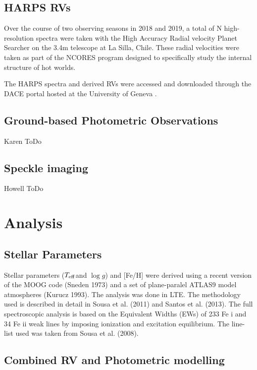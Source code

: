 \documentclass[fleqn,usenatbib]{mnras}
\newcommand{\teff}{$T_{\rm eff}$}
\newcommand{\logg}{$\log g$}
\begin{document}
\subsection{HARPS RVs}
Over the course of two observing seasons in 2018 and 2019, a total of N high-resolution spectra were taken with the High Accuracy Radial velocity Planet Searcher on the 3.4m telescope at La Silla, Chile.
These radial velocities were taken as part of the NCORES program designed to specifically study the internal structure of hot worlds.

The HARPS spectra and derived RVs were accessed and downloaded through the DACE portal hosted at the University of Geneva \citep{2015ASPC..495....7B}.

\subsection{Ground-based Photometric Observations}
Karen ToDo

\subsection{Speckle imaging}
Howell ToDo

\section{Analysis}

\subsection{Stellar Parameters}
Stellar parameters (\teff and \logg) and [Fe/H] were derived using
a recent version of the MOOG code (Sneden 1973) and a set of plane-paralel
ATLAS9 model atmospheres (Kurucz 1993). The analysis was done in LTE. The methodology used is described 
in detail in Sousa et al. (2011) and Santos et al. (2013). The full spectroscopic analysis is 
based on the Equivalent Widths (EWs) of 233 Fe i and 34 Fe ii weak lines
by imposing ionization and excitation equilibrium. The line-list used
was taken from Sousa et al. (2008). 


\subsection{Combined RV and Photometric modelling}
\end{document}
